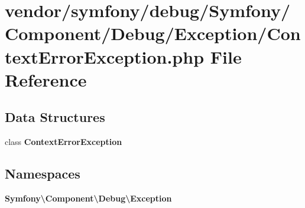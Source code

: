 \section{vendor/symfony/debug/\+Symfony/\+Component/\+Debug/\+Exception/\+Context\+Error\+Exception.php File Reference}
\label{_context_error_exception_8php}
\subsection*{Data Structures}
\begin{DoxyCompactItemize}
\item 
class {\bf Context\+Error\+Exception}
\end{DoxyCompactItemize}
\subsection*{Namespaces}
\begin{DoxyCompactItemize}
\item 
 {\bf Symfony\textbackslash{}\+Component\textbackslash{}\+Debug\textbackslash{}\+Exception}
\end{DoxyCompactItemize}
